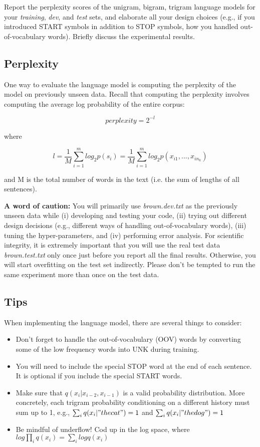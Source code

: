 \documentclass[11pt]{article}
\begin{document}
Report the perplexity scores of the unigram, bigram, trigram language models for your \textit{training}, \textit{dev}, and \textit{test} sets, and elaborate all your design choices (e.g., if you introduced START symbols in addition to STOP symbols, how you handled out-of-vocabulary words). Briefly discuss the experimental results.

\subsection*{Perplexity}

One way to evaluate the language model is computing the perplexity of the model on previously unseen data. Recall that computing the perplexity involves computing the average log probability of the entire corpus:

\begin{equation}
	perplexity = 2^{-l}
\end{equation}

where

\begin{equation}
	l = \frac{1}{M}{\displaystyle \sum_{i=1}^{m} log_2p(s_i)}=\frac{1}{M}{\displaystyle \sum_{i=1}^{m} log_2p(x_{i1},...,x_{in_k})}
\end{equation}

and M is the total number of words in the text (i.e. the sum of lengths of all sentences).

\textbf{A word of caution:} You will primarily use \textit{brown.dev.txt} as the previously unseen data while (i) developing and testing your code, (ii) trying out different design decisions (e.g., different ways of handling out-of-vocabulary words), (iii) tuning the hyper-parameters, and (iv) performing error analysis. For scientific integrity, it is extremely important that you will use the real test data \textit{brown.test.txt} only once just before you report all the final results. Otherwise, you will start overfitting on the test set indirectly. Please don't be tempted to run the same experiment more than once on the test data.

\subsection*{Tips}
When implementing the language model, there are several things to consider:
\begin{itemize}
  \item Don't forget to handle the out-of-vocabulary (OOV) words by converting some of the low frequency words into UNK during training.
  \item You will need to include the special STOP word at the end of each sentence. It is optional if you include the special START words.
  \item Make sure that $q(x_i | x_{i-2}, x_{i-1})$ is a valid probability distribution. More concretely, each trigram probability conditioning on a different history must sum up to 1, e.g., $\sum_i q(x_i|"the cat") = 1$ and $\sum_i q(x_i|"the dog") = 1$ 
  \item Be mindful of underflow! Cod up in the log space, where $log \prod_iq(x_i) = \sum_i log q(x_i)$
\end{itemize}
\end{document}
